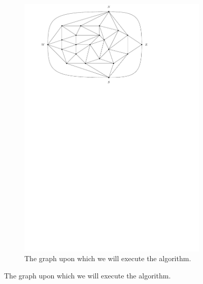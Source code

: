 \begin{figure}
    \centering
    \begin{subfigure}[b]{.9 \textwidth}
      \includegraphics[width=\textwidth]{examples/img/smallExample/smallExample-1}
      \caption{The graph upon which we will execute the algorithm.}
      \label{fig:ex:simple:1}
    \end{subfigure}


\end{figure}
